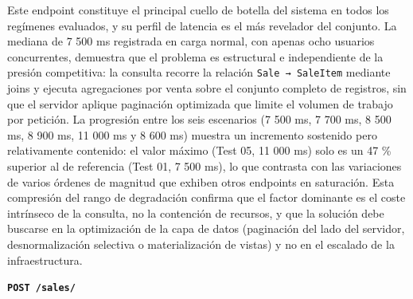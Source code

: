 Este endpoint constituye el principal cuello de botella del sistema en todos los regímenes evaluados, y su perfil de latencia es el más revelador del conjunto. La mediana de 7 500 ms registrada en carga normal, con apenas ocho usuarios concurrentes, demuestra que el problema es estructural e independiente de la presión competitiva: la consulta recorre la relación \texttt{Sale\ →\ SaleItem} mediante joins y ejecuta agregaciones por venta sobre el conjunto completo de registros, sin que el servidor aplique paginación optimizada que limite el volumen de trabajo por petición. La progresión entre los seis escenarios (7 500 ms, 7 700 ms, 8 500 ms, 8 900 ms, 11 000 ms y 8 600 ms) muestra un incremento sostenido pero relativamente contenido: el valor máximo (Test 05, 11 000 ms) solo es un 47 \% superior al de referencia (Test 01, 7 500 ms), lo que contrasta con las variaciones de varios órdenes de magnitud que exhiben otros endpoints en saturación. Esta compresión del rango de degradación confirma que el factor dominante es el coste intrínseco de la consulta, no la contención de recursos, y que la solución debe buscarse en la optimización de la capa de datos (paginación del lado del servidor, desnormalización selectiva o materialización de vistas) y no en el escalado de la infraestructura.

\textbf{\texttt{POST\ /sales/}}

